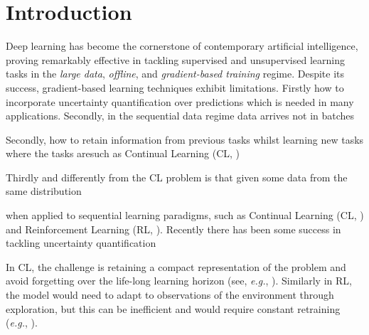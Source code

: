 \documentclass{article}
\makeatletter
\newcommand{\eg}{\textit{e.g.\@}\xspace}
\makeatother
\begin{document}

\section{Introduction}
\label{sec:intro}
%
Deep learning has become the cornerstone of contemporary artificial intelligence, proving remarkably effective in tackling supervised and unsupervised learning tasks in the {\em large data}, {\em offline}, and {\em gradient-based training} regime. Despite its success, gradient-based learning techniques exhibit limitations. Firstly how to incorporate uncertainty quantification over predictions which is needed in many applications. Secondly, in the sequential data regime data arrives not in batches 

Secondly, how to retain information from previous tasks whilst learning new tasks where the tasks aresuch as Continual Learning (CL, \cite{de2021continual})

Thirdly and differently from the CL problem is that given some data from the same distribution 

when applied to sequential learning paradigms, such as Continual Learning (CL, \cite{mccloskey1989catastrophic}) and Reinforcement Learning (RL, \cite{sutton2018reinforcement}). Recently there has been some success in tackling uncertainty quantification

In CL, the challenge is retaining a compact representation of the problem and avoid forgetting over the life-long learning horizon (see, \eg, \cite{add}). Similarly in RL, the model would need to adapt to observations of the environment through exploration, but this can be inefficient and would require constant retraining (\eg, \cite{add, add}).
\end{document}
